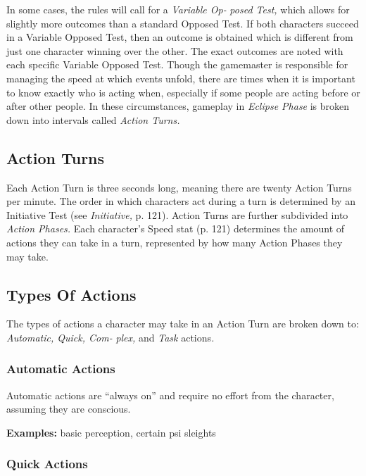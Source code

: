In some cases, the rules will call for a \textit{Variable Op-}
\textit{posed Test,} which allows for slightly more outcomes 
than a standard Opposed Test. If both characters 
succeed in a Variable Opposed Test, then an outcome 
is obtained which is different from just one character 
winning over the other. The exact outcomes are noted 
with each specific Variable Opposed Test.
Though the gamemaster is responsible for managing 
the speed at which events unfold, there are times 
when it is important to know exactly who is acting 
when, especially if some people are acting before or 
after other people. In these circumstances, gameplay 
in \textit{Eclipse Phase} is broken down into intervals called 
\textit{Action Turns.}

\subsection{Action Turns}

Each Action Turn is three seconds long, meaning 
there are twenty Action Turns per minute. The order 
in which characters act during a turn is determined 
by an Initiative Test (see \textit{Initiative,} p. 121). Action 
Turns are further subdivided into \textit{Action Phases.} Each 
character's Speed stat (p. 121) determines the amount 
of actions they can take in a turn, represented by how 
many Action Phases they may take.

\subsection{Types Of Actions}

The types of actions a character may take in an Action 
Turn are broken down to: \textit{Automatic, Quick, Com-}
\textit{plex, }and \textit{Task }actions\textit{.}

\subsubsection{Automatic Actions}

Automatic actions are ``always on'' and require no 
effort from the character, assuming they are conscious.

\textbf{Examples:} basic perception, certain psi sleights

\subsubsection{Quick Actions}

